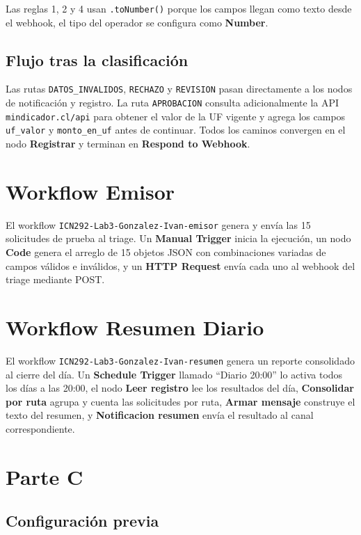 \documentclass[12pt,a4paper]{article}
\begin{document}
Las reglas 1, 2 y 4 usan \texttt{.toNumber()} porque los campos llegan como texto desde el webhook, el tipo del operador se configura como \textbf{Number}.

\subsection{Flujo tras la clasificaci\'on}

Las rutas \texttt{DATOS\_INVALIDOS}, \texttt{RECHAZO} y \texttt{REVISION} pasan directamente a los nodos de notificaci\'on y registro. La ruta \texttt{APROBACION} consulta adicionalmente la API \texttt{mindicador.cl/api} para obtener el valor de la UF vigente y agrega los campos \texttt{uf\_valor} y \texttt{monto\_en\_uf} antes de continuar. Todos los caminos convergen en el nodo \textbf{Registrar} y terminan en \textbf{Respond to Webhook}.

\section{Workflow Emisor}

El workflow \texttt{ICN292-Lab3-Gonzalez-Ivan-emisor} genera y env\'ia las 15 solicitudes de prueba al triage. Un \textbf{Manual Trigger} inicia la ejecuci\'on, un nodo \textbf{Code} genera el arreglo de 15 objetos JSON con combinaciones variadas de campos v\'alidos e inv\'alidos, y un \textbf{HTTP Request} env\'ia cada uno al webhook del triage mediante POST.

\section{Workflow Resumen Diario}

El workflow \texttt{ICN292-Lab3-Gonzalez-Ivan-resumen} genera un reporte consolidado al cierre del d\'ia. Un \textbf{Schedule Trigger} llamado ``Diario 20:00'' lo activa todos los d\'ias a las 20:00, el nodo \textbf{Leer registro} lee los resultados del d\'ia, \textbf{Consolidar por ruta} agrupa y cuenta las solicitudes por ruta, \textbf{Armar mensaje} construye el texto del resumen, y \textbf{Notificacion resumen} env\'ia el resultado al canal correspondiente.

\section{Parte C}

\subsection{Configuraci\'on previa}
\end{document}
